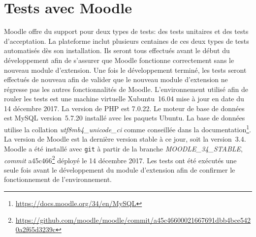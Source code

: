 \chapter{Tests avec Moodle}
Moodle offre du support pour deux types de tests: des tests unitaires et des tests d'acceptation.
La plateforme inclut plusieurs centaines de ces deux types de tests automatis\'es d\`es son installation.
Ils seront tous effectu\'es avant le d\'ebut du d\'eveloppement afin de s'assurer que Moodle fonctionne correctement sans le nouveau module d'extension.
Une fois le d\'eveloppement termin\'e, les tests seront effectu\'es de nouveau afin de valider que le nouveau module d'extension ne r\'egresse pas les autres fonctionnalit\'es de Moodle.
L'environnement utilis\'e afin de rouler les tests est une machine virtuelle Xubuntu~16.04 mise \`a jour en date du 14 d\'ecembre 2017.
La version de PHP est 7.0.22.
Le moteur de base de donn\'ees est MySQL version~5.7.20 install\'e avec les paquets Ubuntu.
La base de donn\'ees utilise la collation \textit{utf8mb4\_unicode\_ci} comme conseill\'ee dans la documentation\footnote{\url{https://docs.moodle.org/34/en/MySQL}}.
La version de Moodle est la derni\`ere version stable \`a ce jour, soit la version~3.4.
Moodle a \'et\'e install\'e avec \texttt{git} \`a partir de la branche \textit{MOODLE\_34\_STABLE}, \textit{commit} a45c466\footnote{\url{https://github.com/moodle/moodle/commit/a45c46600021667691dbb4bce5420a2f65d3239c}} d\'eploy\'e le 14 d\'ecembre 2017.
Les tests ont \'et\'e ex\'ecut\'es une seule fois avant le d\'eveloppement du module d'extension afin de confirmer le fonctionnement de l'environnement.
